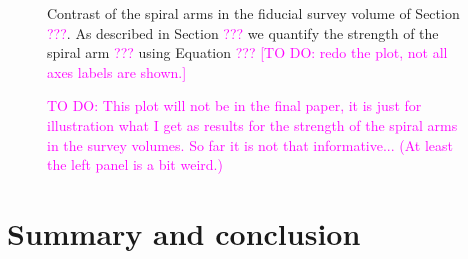 \documentclass[iop,revtex4,numberedappendix,appendixfloats]{emulateapj}
\newcommand{\Wilma}[1]{\textcolor{Magenta}{#1}}
\begin{document}
\begin{figure}[!htbp]
\caption{Contrast of the spiral arms in the fiducial survey volume of Section \Wilma{???}. As described in Section \Wilma{???} we quantify the strength of the spiral arm \Wilma{???} using Equation \Wilma{???} \Wilma{[TO DO: redo the plot, not all axes labels are shown.]}}
\label{fig:???}
\end{figure}

\begin{figure}[!htbp]
\caption{\Wilma{TO DO: This plot will not be in the final paper, it is just for illustration what I get as results for the strength of the spiral arms in the survey volumes. So far it is not that informative... (At least the left panel is a bit weird.)}}
\label{fig:???}
\end{figure}



\section{Summary and conclusion}

{}

\end{document}
